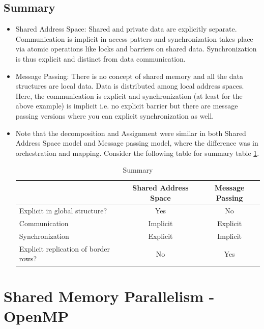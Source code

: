 \documentclass[12pt]{book}
\begin{document}
\subsection{Summary}
\begin{itemize}
\item Shared Address Space: Shared and private data are explicitly separate. Communication is implicit in access patters and synchronization takes place via atomic operations like locks and barriers on shared data.
Synchronization is thus explicit and distinct from data communication.
\item Message Passing: There is no concept of shared memory and all the data structures are local data. Data is distributed among local address spaces. 
Here, the communication is explicit and synchronization (at least for the above example) is implicit i.e. no explicit barrier but there are message passing versions where you can explicit synchronization as well.
\item Note that the decomposition and Assignment were similar in both Shared Address Space model and Message passing model, where the difference was in orchestration and mapping. Consider the following table for summary table \ref{tab:finsummary}.
\begin{table}[H]
    \centering
    \begin{tabular}{|p{}|c|c|}
        \hline
        & Shared Address Space & Message Passing \\
        \hline
        Explicit in global structure? & Yes & No\\
        Communication & Implicit & Explicit \\
        Synchronization & Explicit & Implicit \\
        Explicit replication of border rows? & No & Yes \\
        \hline
    \end{tabular}
    \caption{Summary}
    \label{tab:finsummary}
\end{table}
\end{itemize}

\section{Shared Memory Parallelism - OpenMP}
\end{document}
